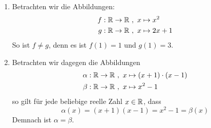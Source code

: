 \begin{bsp} \label{bsp:abbgleich} \quad
    \begin{enumerate}
        \item Betrachten wir die Abbildungen: 
        \begin{align*}
            f: \mathbb R \to \mathbb R\ &,\ x \mapsto x^2 \\
            g: \mathbb R \to \mathbb R\ &,\ x \mapsto 2x+1
        \end{align*}
        So ist $f \neq g$, denn es ist $f(1)=1$ und $g(1)=3$.
        \item Betrachten wir dagegen die Abbildungen
        \begin{align*}
            \alpha: \mathbb R \to \mathbb R\ &,\ x \mapsto (x+1)\cdot (x-1) \\
            \beta: \mathbb R \to \mathbb R\ &,\ x \mapsto  x^2-1
        \end{align*}
	so gilt für jede beliebige reelle Zahl $x\in \mathbb R$, dass
            \[ \alpha(x) = (x+1)(x-1) = x^2-1 = \beta(x) \]
        Demnach ist $\alpha=\beta$.
    \end{enumerate}
\end{bsp}


